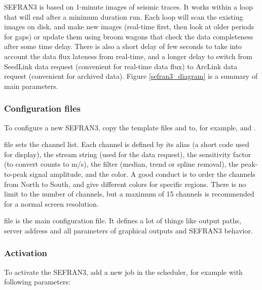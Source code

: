 SEFRAN3 is based on 1-minute images of seismic traces. It works within a loop that will end after a minimum duration run. Each loop will scan the existing images on disk, and make new images (real-time first, then look at older periods for gaps) or update them using broom wagons that check the data completeness after some time delay. There is also a short delay of few seconds to take into account the data flux lateness from real-time, and a longer delay to switch from SeedLink data request (convenient for real-time data flux) to ArcLink data request (convenient for archived data). Figure \ref{sefran3_diagram} is a summary of main parameters.


\subsubsection{Configuration files}

To configure a new SEFRAN3, copy the template files  and  to, for example,  and .


 file sets the channel list. Each channel is defined by its alias (a short code used for display), the stream string (used for the data request), the sensitivity factor (to convert counts to m/s), the filter (median, trend or spline removal), the peak-to-peak signal amplitude, and the color. A good conduct is to order the channels from North to South, and give different colors for specific regions. There is no limit to the number of channels, but a maximum of 15 channels is recommended for a normal screen resolution.

 file is the main configuration file. It defines a lot of things like output paths, server address and all parameters of graphical outputs and SEFRAN3 behavior.






\subsubsection{Activation}

To activate the SEFRAN3, add a new job in the scheduler, for example with following parameters:

